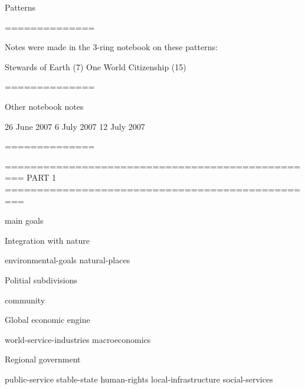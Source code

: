 
Patterns

==============

Notes were made in the 3-ring notebook on these patterns:

	Stewards of Earth (7)
	One World Citizenship (15)
	
==============

Other notebook notes

	26 June 2007
	6 July 2007
	12 July 2007

==============


	


=================================================
 PART 1
=================================================



	main goals

Integration with nature

	environmental-goals
	natural-places

Politial subdivisions 

	community

Global economic engine

	world-service-industries
	macroeconomics

Regional government

	public-service
	stable-state
	human-rights
	local-infrastructure
	social-services


